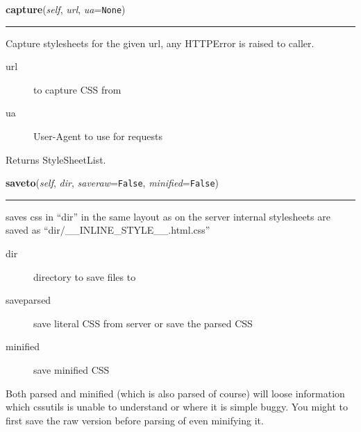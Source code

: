     \vspace{0.5ex}

\hspace{.8\funcindent}\begin{boxedminipage}{\funcwidth}

    \raggedright \textbf{capture}(\textit{self}, \textit{url}, \textit{ua}={\tt None})

    \vspace{-1.5ex}

    \rule{\textwidth}{0.5\fboxrule}
\setlength{\parskip}{2ex}

Capture stylesheets for the given url, any HTTPError is raised to
caller.
\begin{description}
\item[{url}] \leavevmode 
to capture CSS from

\item[{ua}] \leavevmode 
User-Agent to use for requests

\end{description}

Returns StyleSheetList.
\setlength{\parskip}{1ex}
    \end{boxedminipage}

    \label{cssutils:scripts:csscapture:CSSCapture:saveto}

    \vspace{0.5ex}

\hspace{.8\funcindent}\begin{boxedminipage}{\funcwidth}

    \raggedright \textbf{saveto}(\textit{self}, \textit{dir}, \textit{saveraw}={\tt False}, \textit{minified}={\tt False})

    \vspace{-1.5ex}

    \rule{\textwidth}{0.5\fboxrule}
\setlength{\parskip}{2ex}

saves css in ``dir'' in the same layout as on the server
internal stylesheets are saved as ``dir/{\_}{\_}INLINE{\_}STYLE{\_}{\_}.html.css''
\begin{description}
\item[{dir}] \leavevmode 
directory to save files to

\item[{saveparsed}] \leavevmode 
save literal CSS from server or save the parsed CSS

\item[{minified}] \leavevmode 
save minified CSS

\end{description}

Both parsed and minified (which is also parsed of course) will
loose information which cssutils is unable to understand or where
it is simple buggy. You might to first save the raw version before
parsing of even minifying it.
\setlength{\parskip}{1ex}
    \end{boxedminipage}


